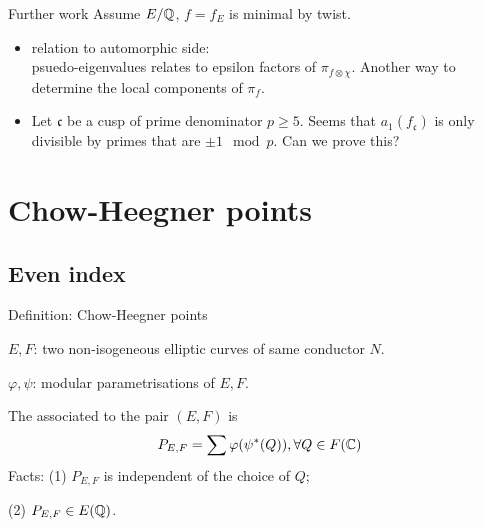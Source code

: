 \documentclass[handout]{beamer}
\newcommand{\fc}{\mathfrak{c}}
\begin{document}
\begin{frame}{Further work}
Assume $E/\mathbb{Q}$, $f = f_E$ is minimal by twist. 
\begin{itemize}
\item relation to automorphic side: \\ psuedo-eigenvalues relates to epsilon factors of $\pi_{f \otimes \chi}$. Another way to determine the local components of $\pi_f$. 
 
\item Let $\fc$ be a cusp of prime denominator $p \geq 5$. Seems that $a_1(f_\fc)$ is only divisible by primes that are $\pm 1 \mod{p}$. Can we prove this? 
 \end{itemize}
\end{frame}


\section{Chow-Heegner points}


 \begin{frame}
 \frametitle{\insertsection}
 \tableofcontents[currentsection]
 \end{frame}
 
\subsection{Even index}

\begin{frame}[fragile]{Definition: Chow-Heegner points}
\begin{center}
\end{center}
$E,F$: two non-isogeneous elliptic curves of  same conductor $N$. 

$\varphi, \psi$: modular parametrisations of $E,F$. 

The  associated to the pair $(E,F)$ is 
\[
	P_{E,F} = \sum \varphi(\psi^{*}(Q)), \forall Q \in F(\mathbb{C}) 
\]
Facts: (1) $P_{E,F}$ is independent of the choice of $Q$;  

\qquad \quad (2) $P_{E,F} \in E(\mathbb{Q})$. 

\end{frame}
\end{document}
